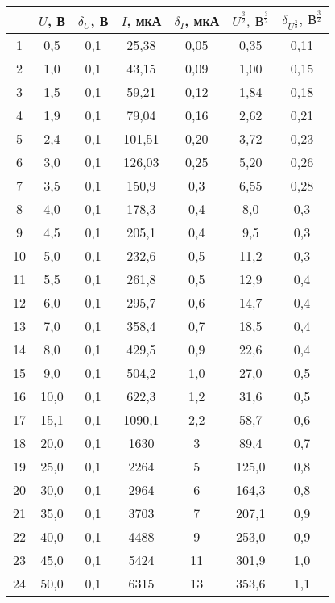 \begin{table}
\centering
\label{tbl:7}
\begin{tabular}{|c|c|c|c|c|c|c|}
\hline
 & $U$, В & $\delta_U$, В & $I$, мкА & $\delta_I$, мкА & $U^{\frac{3}{2}},\ В^{\frac{3}{2}}$ & $\delta_{U^{\frac{3}{2}}},\ В^{\frac{3}{2}}$ \\
\hline
1 & 0,5 & 0,1 & 25,38 & 0,05 & 0,35 & 0,11 \\
\cline{1-7}
2 & 1,0 & 0,1 & 43,15 & 0,09 & 1,00 & 0,15 \\
\cline{1-7}
3 & 1,5 & 0,1 & 59,21 & 0,12 & 1,84 & 0,18 \\
\cline{1-7}
4 & 1,9 & 0,1 & 79,04 & 0,16 & 2,62 & 0,21 \\
\cline{1-7}
5 & 2,4 & 0,1 & 101,51 & 0,20 & 3,72 & 0,23 \\
\cline{1-7}
6 & 3,0 & 0,1 & 126,03 & 0,25 & 5,20 & 0,26 \\
\cline{1-7}
7 & 3,5 & 0,1 & 150,9 & 0,3 & 6,55 & 0,28 \\
\cline{1-7}
8 & 4,0 & 0,1 & 178,3 & 0,4 & 8,0 & 0,3 \\
\cline{1-7}
9 & 4,5 & 0,1 & 205,1 & 0,4 & 9,5 & 0,3 \\
\cline{1-7}
10 & 5,0 & 0,1 & 232,6 & 0,5 & 11,2 & 0,3 \\
\cline{1-7}
11 & 5,5 & 0,1 & 261,8 & 0,5 & 12,9 & 0,4 \\
\cline{1-7}
12 & 6,0 & 0,1 & 295,7 & 0,6 & 14,7 & 0,4 \\
\cline{1-7}
13 & 7,0 & 0,1 & 358,4 & 0,7 & 18,5 & 0,4 \\
\cline{1-7}
14 & 8,0 & 0,1 & 429,5 & 0,9 & 22,6 & 0,4 \\
\cline{1-7}
15 & 9,0 & 0,1 & 504,2 & 1,0 & 27,0 & 0,5 \\
\cline{1-7}
16 & 10,0 & 0,1 & 622,3 & 1,2 & 31,6 & 0,5 \\
\cline{1-7}
17 & 15,1 & 0,1 & 1090,1 & 2,2 & 58,7 & 0,6 \\
\cline{1-7}
18 & 20,0 & 0,1 & 1630 & 3 & 89,4 & 0,7 \\
\cline{1-7}
19 & 25,0 & 0,1 & 2264 & 5 & 125,0 & 0,8 \\
\cline{1-7}
20 & 30,0 & 0,1 & 2964 & 6 & 164,3 & 0,8 \\
\cline{1-7}
21 & 35,0 & 0,1 & 3703 & 7 & 207,1 & 0,9 \\
\cline{1-7}
22 & 40,0 & 0,1 & 4488 & 9 & 253,0 & 0,9 \\
\cline{1-7}
23 & 45,0 & 0,1 & 5424 & 11 & 301,9 & 1,0 \\
\cline{1-7}
24 & 50,0 & 0,1 & 6315 & 13 & 353,6 & 1,1 \\
\cline{1-7}
\hline
\end{tabular}
\end{table}

